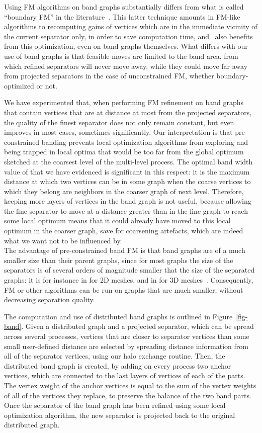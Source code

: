 \documentclass[fleqn,12pt,twoside]{article}
\begin{document}
Using FM algorithms on band graphs substantially differs from what is
called ``boundary FM'' in the literature~\cite{hele93c,kaku98b}. This
latter technique amounts in FM-like algorithms to recomputing gains of
vertices which are in the immediate vicinity of the current separator
only, in order to save computation time, and \scotch\ also benefits
from this optimization, even on band graphs themselves. What differs
with our use of band graphs is that feasible moves are limited to the
band area, from which refined separators will never move away, while
they could move far away from projected separators in the case of
unconstrained FM, whether boundary-optimized or not.

We have experimented that, when performing FM refinement on band
graphs that contain vertices that are at distance at most  from the
projected separators, the quality of the finest separator does not
only remain constant, but even improves in most cases, sometimes
significantly. Our interpretation is that pre-constrained banding
prevents local optimization algorithms from exploring and being
trapped in local optima that would be too far from the global optimum
sketched at the coarsest level of the multi-level process. The
optimal band width value of  that we have evidenced is significant
in this respect: it is the maximum distance at which two vertices can
be in some graph when the coarse vertices to which they belong are
neighbors in the coarser graph of next level. Therefore, keeping more
layers of vertices in the band graph is not useful, because allowing
the fine separator to move at a distance greater than  in the fine
graph to reach some local optimum means that it could already have moved
to this local optimum in the coarser graph, save for coarsening
artefacts, which are indeed what we want not to be influenced by.
\\

The advantage of pre-constrained band FM is that band graphs are of a
much smaller size than their parent graphs, since for most graphs the
size of the separators is of several orders of magnitude smaller that
the size of the separated graphs: it is for instance in
 for 2D meshes, and in  for 3D
meshes~\cite{lirota79}. Consequently, FM or other algorithms can be
run on graphs that are much smaller, without decreasing separation
quality.

The computation and use of distributed band graphs is outlined in
Figure~\ref{fig-band}. Given a distributed graph and a projected
separator, which can be spread across several processes, vertices
that are closer to separator vertices than some small user-defined
distance are selected by spreading distance information from all of
the separator vertices, using our halo exchange routine. Then, the
distributed band graph is created, by adding on every process two
anchor vertices, which are connected to the last layers of vertices of
each of the parts. The vertex weight of the anchor vertices is equal
to the sum of the vertex weights of all of the vertices they replace,
to preserve the balance of the two band parts. Once the separator of
the band graph has been refined using some local optimization
algorithm, the new separator is projected back to the original
distributed graph.
\end{document}

